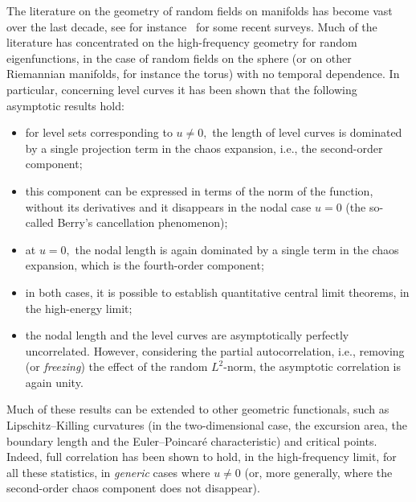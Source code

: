 \documentclass[AHL,Unicode,longabstracts,published]{cedram}
\begin{document}
The literature on the geometry of random fields on manifolds has become vast over the last decade, see for instance~\cite{M2022,Rossi2018,Wig22} for some recent surveys. Much of the literature has concentrated on the high-frequency geometry for random eigenfunctions, in the case of random fields on the sphere (or on other Riemannian manifolds, for instance the torus) with no temporal dependence. In particular, concerning level curves it has been shown that the following asymptotic results hold:
\begin{itemize}
\item for level sets corresponding to $u\neq 0,$ the length of level curves is dominated by a single projection term in the chaos expansion, i.e., the second-order component;

\item this component can be expressed in terms of the norm of the function, without its derivatives and it disappears in the nodal case $u=0$ (the so-called Berry's cancellation phenomenon);

\item at $u=0,$ the nodal length is again dominated by a single term in the chaos expansion, which is the fourth-order component;

\item in both cases, it is possible to establish quantitative central limit theorems, in the high-energy limit;

\item the nodal length and the level curves are asymptotically perfectly uncorrelated. However, considering the partial autocorrelation, i.e., removing (or \emph{freezing}) the effect of the random $L^{2}$-norm, the asymptotic correlation is again unity.
\end{itemize}

Much of these results can be extended to other geometric functionals, such as Lipschitz--Killing curvatures (in the two-dimensional case, the excursion area, the boundary length and the Euler--Poincaré characteristic) and critical points. Indeed, full correlation has been shown to hold, in the high-frequency limit, for all these statistics, in \emph{generic} cases where $u\neq 0$ (or, more generally, where the second-order chaos component does not disappear).
\end{document}
